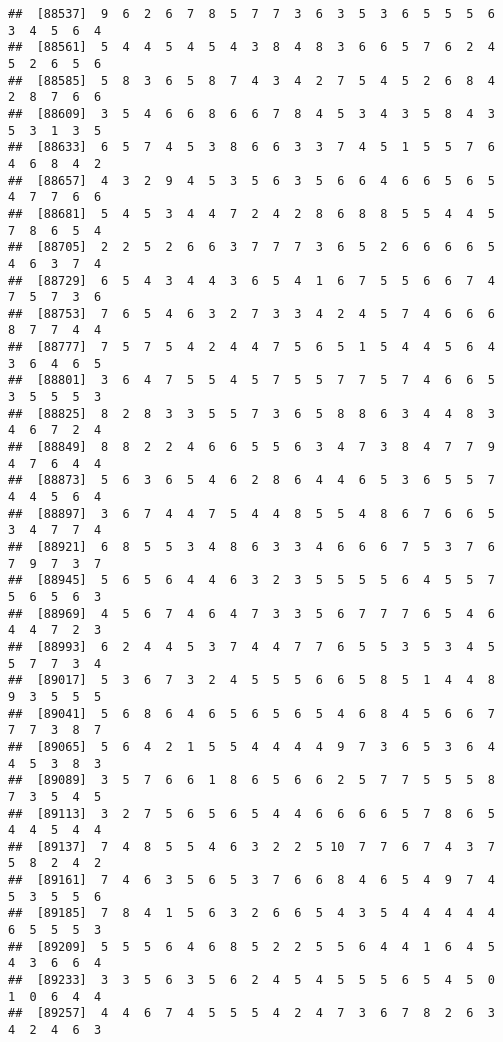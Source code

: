\documentclass[
]{book}
\begin{document}
\begin{verbatim}
##  [88537]  9  6  2  6  7  8  5  7  7  3  6  3  5  3  6  5  5  5  6  3  4  5  6  4
##  [88561]  5  4  4  5  4  5  4  3  8  4  8  3  6  6  5  7  6  2  4  5  2  6  5  6
##  [88585]  5  8  3  6  5  8  7  4  3  4  2  7  5  4  5  2  6  8  4  2  8  7  6  6
##  [88609]  3  5  4  6  6  8  6  6  7  8  4  5  3  4  3  5  8  4  3  5  3  1  3  5
##  [88633]  6  5  7  4  5  3  8  6  6  3  3  7  4  5  1  5  5  7  6  4  6  8  4  2
##  [88657]  4  3  2  9  4  5  3  5  6  3  5  6  6  4  6  6  5  6  5  4  7  7  6  6
##  [88681]  5  4  5  3  4  4  7  2  4  2  8  6  8  8  5  5  4  4  5  7  8  6  5  4
##  [88705]  2  2  5  2  6  6  3  7  7  7  3  6  5  2  6  6  6  6  5  4  6  3  7  4
##  [88729]  6  5  4  3  4  4  3  6  5  4  1  6  7  5  5  6  6  7  4  7  5  7  3  6
##  [88753]  7  6  5  4  6  3  2  7  3  3  4  2  4  5  7  4  6  6  6  8  7  7  4  4
##  [88777]  7  5  7  5  4  2  4  4  7  5  6  5  1  5  4  4  5  6  4  3  6  4  6  5
##  [88801]  3  6  4  7  5  5  4  5  7  5  5  7  7  5  7  4  6  6  5  3  5  5  5  3
##  [88825]  8  2  8  3  3  5  5  7  3  6  5  8  8  6  3  4  4  8  3  4  6  7  2  4
##  [88849]  8  8  2  2  4  6  6  5  5  6  3  4  7  3  8  4  7  7  9  4  7  6  4  4
##  [88873]  5  6  3  6  5  4  6  2  8  6  4  4  6  5  3  6  5  5  7  4  4  5  6  4
##  [88897]  3  6  7  4  4  7  5  4  4  8  5  5  4  8  6  7  6  6  5  3  4  7  7  4
##  [88921]  6  8  5  5  3  4  8  6  3  3  4  6  6  6  7  5  3  7  6  7  9  7  3  7
##  [88945]  5  6  5  6  4  4  6  3  2  3  5  5  5  5  6  4  5  5  7  5  6  5  6  3
##  [88969]  4  5  6  7  4  6  4  7  3  3  5  6  7  7  7  6  5  4  6  4  4  7  2  3
##  [88993]  6  2  4  4  5  3  7  4  4  7  7  6  5  5  3  5  3  4  5  5  7  7  3  4
##  [89017]  5  3  6  7  3  2  4  5  5  5  6  6  5  8  5  1  4  4  8  9  3  5  5  5
##  [89041]  5  6  8  6  4  6  5  6  5  6  5  4  6  8  4  5  6  6  7  7  7  3  8  7
##  [89065]  5  6  4  2  1  5  5  4  4  4  4  9  7  3  6  5  3  6  4  4  5  3  8  3
##  [89089]  3  5  7  6  6  1  8  6  5  6  6  2  5  7  7  5  5  5  8  7  3  5  4  5
##  [89113]  3  2  7  5  6  5  6  5  4  4  6  6  6  6  5  7  8  6  5  4  4  5  4  4
##  [89137]  7  4  8  5  5  4  6  3  2  2  5 10  7  7  6  7  4  3  7  5  8  2  4  2
##  [89161]  7  4  6  3  5  6  5  3  7  6  6  8  4  6  5  4  9  7  4  5  3  5  5  6
##  [89185]  7  8  4  1  5  6  3  2  6  6  5  4  3  5  4  4  4  4  4  6  5  5  5  3
##  [89209]  5  5  5  6  4  6  8  5  2  2  5  5  6  4  4  1  6  4  5  4  3  6  6  4
##  [89233]  3  3  5  6  3  5  6  2  4  5  4  5  5  5  6  5  4  5  0  1  0  6  4  4
##  [89257]  4  4  6  7  4  5  5  5  4  2  4  7  3  6  7  8  2  6  3  4  2  4  6  3

\end{verbatim}
\end{document}
